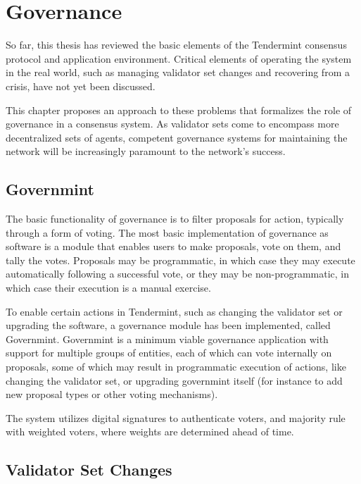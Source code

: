 \chapter{Governance}
\label{ch:governance}

So far, this thesis has reviewed the basic elements of the Tendermint consensus protocol and application environment.
Critical elements of operating the system in the real world, such as managing validator set changes
and recovering from a crisis, have not yet been discussed. 

This chapter proposes an approach to these problems that formalizes the role of governance in a consensus system.
As validator sets come to encompass more decentralized sets of agents, competent governance systems 
for maintaining the network will be increasingly paramount to the network's success.

\section{Governmint}

The basic functionality of governance is to filter proposals for action, typically through a form of voting.
The most basic implementation of governance as software is a module that enables users to make proposals,
vote on them, and tally the votes. 
Proposals may be programmatic, in which case they may execute automatically following a successful vote,
or they may be non-programmatic, in which case their execution is a manual exercise.

To enable certain actions in Tendermint, such as changing the validator set or upgrading the software,
a governance module has been implemented, called Governmint.
Governmint is a minimum viable governance application with support for multiple groups of entities,
each of which can vote internally on proposals, some of which may result in programmatic execution of actions,
like changing the validator set, or upgrading governmint itself (for instance to add new proposal types or other voting mechanisms).

The system utilizes digital signatures to authenticate voters, 
and majority rule with weighted voters, where weights are determined ahead of time.

\section{Validator Set Changes}

